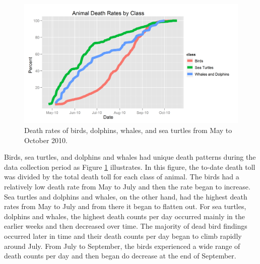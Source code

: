 \documentclass[11pt]{article}
\begin{document}
\begin{figure}[htbp] %
   \centering
   \includegraphics[width=5in]{death-rates.png} 
   \caption{Death rates of birds, dolphins, whales, and sea turtles from May to October 2010. }
   \label{death rates}
\end{figure}

Birds, sea turtles, and dolphins and whales had unique death patterns during the data collection period as Figure \ref{death rates}  illustrates. In this figure, the to-date death toll was divided by the total death toll for each class of animal. The birds had a relatively low death rate from May to July and then the rate began to increase. Sea turtles and dolphins and whales, on the other hand, had the highest death rates from May to July and from there it began to flatten out. For sea turtles, dolphins and whales, the highest death counts per day occurred mainly in the earlier weeks and then decreased over time.  The majority of dead bird findings occurred later in time and their death counts per day began to climb rapidly around July. From July to September, the birds experienced a wide range of death counts per day and then began do decrease at the end of September.   
\end{document}
